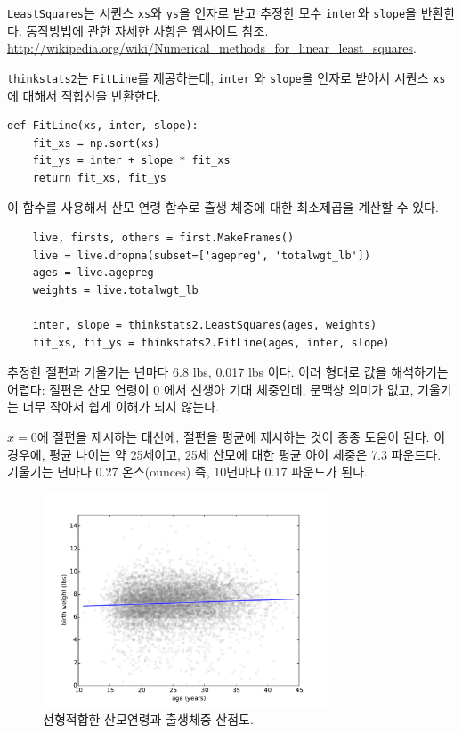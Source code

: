 {\tt LeastSquares}는 시퀀스 {\tt xs}와 {\tt ys}을 인자로 받고 추정한 모수 {\tt inter}와
{\tt slope}을 반환한다. 동작방법에 관한 자세한 사항은 웹사이트 참조. \url{http://wikipedia.org/wiki/Numerical_methods_for_linear_least_squares}.


{\tt thinkstats2}는 {\tt FitLine}를 제공하는데, {\tt inter} 와 {\tt slope}을 인자로 받아서 시퀀스 {\tt xs}에 대해서 적합선을 반환한다.

\begin{verbatim}
def FitLine(xs, inter, slope):
    fit_xs = np.sort(xs)
    fit_ys = inter + slope * fit_xs
    return fit_xs, fit_ys
\end{verbatim}

이 함수를 사용해서 산모 연령 함수로 출생 체중에 대한 최소제곱을 계산할 수 있다.

\begin{verbatim}
    live, firsts, others = first.MakeFrames()
    live = live.dropna(subset=['agepreg', 'totalwgt_lb'])
    ages = live.agepreg
    weights = live.totalwgt_lb

    inter, slope = thinkstats2.LeastSquares(ages, weights)
    fit_xs, fit_ys = thinkstats2.FitLine(ages, inter, slope)
\end{verbatim}

추정한 절편과 기울기는 년마다 6.8 lbs, 0.017 lbs 이다.
이러 형태로 값을 해석하기는 어렵다: 절편은 산모 연령이 0 에서 신생아 기대 체중인데,
문맥상 의미가 없고, 기울기는 너무 작아서 쉽게 이해가 되지 않는다.


$x=0$에 절편을 제시하는 대신에, 절편을 평균에 제시하는 것이 종종 도움이 된다.
이 경우에, 평균 나이는 약 25세이고, 25세 산모에 대한 평균 아이 체중은 7.3 파운드다.
기울기는 년마다 0.27 온스(ounces) 즉, 10년마다 0.17 파운드가 된다.

\begin{figure}
\centerline{\includegraphics[height=2.5in]{figs/linear1.pdf}}
\caption{선형적합한 산모연령과 출생체중 산점도.}
\label{linear1}
\end{figure}

